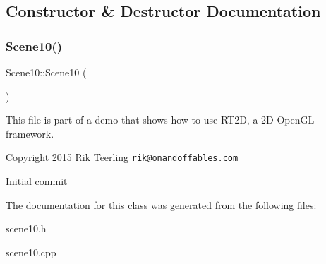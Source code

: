 \subsection{Constructor \& Destructor Documentation}
\mbox{\label{class_scene10_adce71ede75c32dd246ec0d491dec531b}} 
\subsubsection{\texorpdfstring{Scene10()}{Scene10()}}
{\footnotesize\ttfamily Scene10\+::\+Scene10 (\begin{DoxyParamCaption}{ }\end{DoxyParamCaption})}

This file is part of a demo that shows how to use R\+T2D, a 2D Open\+GL framework.


\begin{DoxyItemize}
\item Copyright 2015 Rik Teerling \href{mailto:rik@onandoffables.com}{\tt rik@onandoffables.\+com}
\begin{DoxyItemize}
\item Initial commit 
\end{DoxyItemize}
\end{DoxyItemize}

The documentation for this class was generated from the following files\+:\begin{DoxyCompactItemize}
\item 
scene10.\+h\item 
scene10.\+cpp\end{DoxyCompactItemize}
